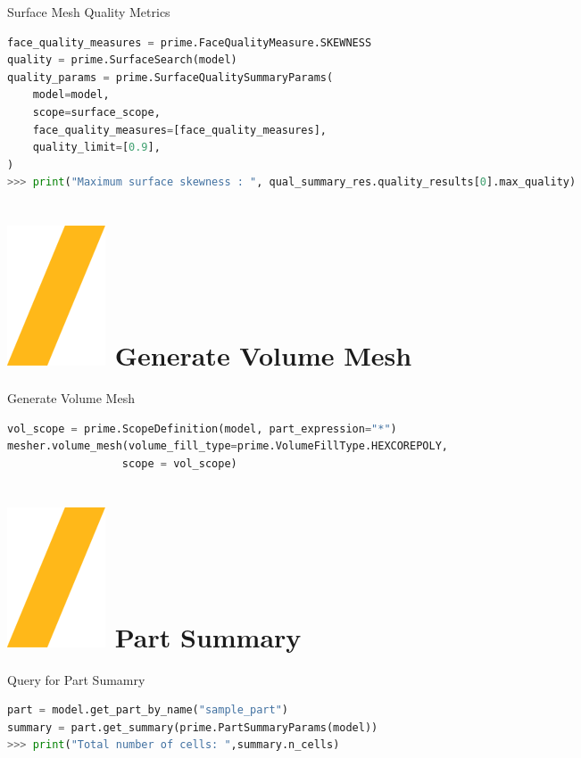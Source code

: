 \documentclass[9pt,landscape]{article}
\begin{document}
\begin{multicols}{3}
Surface Mesh Quality Metrics
\begin{lstlisting}[language=Python]
face_quality_measures = prime.FaceQualityMeasure.SKEWNESS
quality = prime.SurfaceSearch(model)
quality_params = prime.SurfaceQualitySummaryParams(
    model=model,
    scope=surface_scope,
    face_quality_measures=[face_quality_measures],
    quality_limit=[0.9],
)
>>> print("Maximum surface skewness : ", qual_summary_res.quality_results[0].max_quality)
\end{lstlisting}

\section{\includegraphics[height=\fontcharht\font`\S]{slash.png} Generate Volume Mesh}
Generate Volume Mesh
\begin{lstlisting}[language=Python]
vol_scope = prime.ScopeDefinition(model, part_expression="*")
mesher.volume_mesh(volume_fill_type=prime.VolumeFillType.HEXCOREPOLY,
                  scope = vol_scope)
\end{lstlisting}
\section{\includegraphics[height=\fontcharht\font`\S]{slash.png} Part Summary}
Query for Part Sumamry
\begin{lstlisting}[language=Python]
part = model.get_part_by_name("sample_part")
summary = part.get_summary(prime.PartSummaryParams(model))
>>> print("Total number of cells: ",summary.n_cells)
\end{lstlisting}



\end{multicols}
\end{document}
